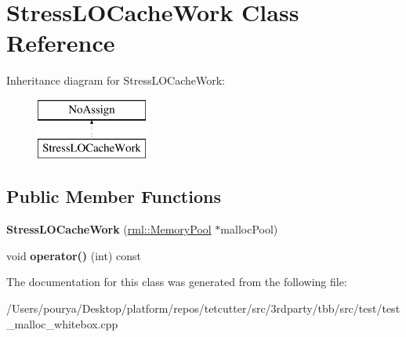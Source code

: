 \hypertarget{classStressLOCacheWork}{}\section{Stress\+L\+O\+Cache\+Work Class Reference}
\label{classStressLOCacheWork}
Inheritance diagram for Stress\+L\+O\+Cache\+Work\+:\begin{figure}[H]
\begin{center}
\leavevmode
\includegraphics[height=2.000000cm]{classStressLOCacheWork}
\end{center}
\end{figure}
\subsection*{Public Member Functions}
\begin{DoxyCompactItemize}
\item 
\hypertarget{classStressLOCacheWork_a5970ddf13583f6d135cf2543f71bfe43}{}{\bfseries Stress\+L\+O\+Cache\+Work} (\hyperlink{classrml_1_1internal_1_1MemoryPool}{rml\+::\+Memory\+Pool} $\ast$malloc\+Pool)\label{classStressLOCacheWork_a5970ddf13583f6d135cf2543f71bfe43}

\item 
\hypertarget{classStressLOCacheWork_ad532568d6626682ac22660b3c8e397be}{}void {\bfseries operator()} (int) const \label{classStressLOCacheWork_ad532568d6626682ac22660b3c8e397be}

\end{DoxyCompactItemize}


The documentation for this class was generated from the following file\+:\begin{DoxyCompactItemize}
\item 
/\+Users/pourya/\+Desktop/platform/repos/tetcutter/src/3rdparty/tbb/src/test/test\+\_\+malloc\+\_\+whitebox.\+cpp\end{DoxyCompactItemize}
